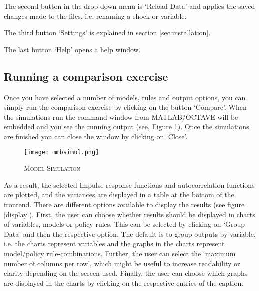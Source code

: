 The second button in the drop-down menu is `Reload Data' and applies the saved changes made to the files, i.e. renaming a shock or variable.

The third button `Settings' is explained in section \ref{sec:installation}.

The last button `Help' opens a help window. 


\subsection*{Running a comparison exercise}
Once you have selected a number of models, rules and output options, you can simply run the comparison exercise by clicking on the button `Compare'. When the simulations run the command window from MATLAB/OCTAVE will be embedded and you see the running output (see, Figure \ref{mmbsimul}). Once the simulations are finished you can close the window by clicking on `Close'.
 
\begin{figure}[H]
	\centering
	\caption{\textsc{Model Simulation}}
	\vspace{0.2cm}
	\texttt{[image: mmbsimul.png]}\\
	\label{mmbsimul}
\end{figure}

As a result, the selected Impulse response functions and  autocorrelation functions are plotted, and the variances are displayed in a table at the bottom of the frontend. 
There are different options available to display the results (see figure \ref{display}). First, the user can choose whether results should be displayed in charts of variables, models or policy rules. This can be selected by clicking on `Group Data' and then the respective option. The default is to group outputs by variable, i.e. the charts represent variables and the graphs in the charts represent model/policy rule-combinations. 
Further, the user can select the `maximum number of columns per row', which might be useful to increase readability or clarity depending on the screen used. 
Finally, the user can choose which graphs are displayed in the charts by clicking on the respective entries of the caption.

